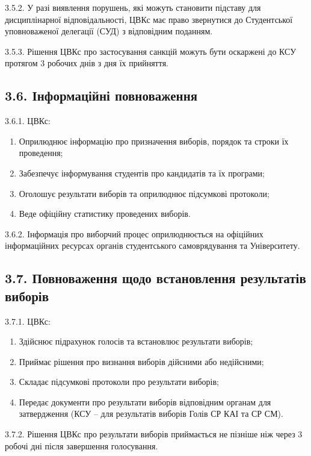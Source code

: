     3.5.2. У разі виявлення порушень, які можуть становити підставу для дисциплінарної відповідальності, ЦВКс має право звернутися до Студентської уповноваженої делегації (СУД) з відповідним поданням.

    3.5.3. Рішення ЦВКс про застосування санкцій можуть бути оскаржені до КСУ протягом 3 робочих днів з дня їх прийняття.

\subsection*{3.6. Інформаційні повноваження}
    3.6.1. ЦВКс:

        \begin{enumerate}[label=\alph*)]
            \item Оприлюднює інформацію про призначення виборів, порядок та строки їх проведення;
            \item Забезпечує інформування студентів про кандидатів та їх програми;
            \item Оголошує результати виборів та оприлюднює підсумкові протоколи;
            \item Веде офіційну статистику проведених виборів.
        \end{enumerate}

    3.6.2. Інформація про виборчий процес оприлюднюється на офіційних інформаційних ресурсах органів студентського самоврядування та Університету.

\subsection*{3.7. Повноваження щодо встановлення результатів виборів}
    3.7.1. ЦВКс:

        \begin{enumerate}[label=\alph*)]
            \item Здійснює підрахунок голосів та встановлює результати виборів;
            \item Приймає рішення про визнання виборів дійсними або недійсними;
            \item Складає підсумкові протоколи про результати виборів;
            \item Передає документи про результати виборів відповідним органам для затвердження (КСУ -- для результатів виборів Голів СР КАІ та СР СМ).
        \end{enumerate}

    3.7.2. Рішення ЦВКс про результати виборів приймається не пізніше ніж через 3 робочі дні після завершення голосування.
